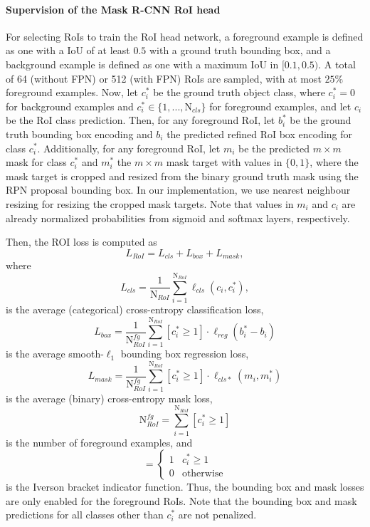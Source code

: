\paragraph{Supervision of the Mask R-CNN RoI head}
For selecting RoIs to train the RoI head network, a foreground example
is defined as one with a IoU of at least $0.5$ with
a ground truth bounding box, and a background example is defined as
one with a maximum IoU in $[0.1, 0.5)$.
A total of 64 (without FPN) or 512 (with FPN) RoIs are sampled, with
at most $25\%$ foreground examples.
Now, let $c_i^*$ be the ground truth object class, where $c_i^* = 0$
for background examples and $c_i^* \in \{1, ..., \text{N}_{cls}\}$ for foreground examples,
and let $c_i$ be the RoI class prediction.
Then, for any foreground RoI, let $b_i^*$ be the ground truth bounding box encoding and $b_i$
the predicted refined RoI box encoding for class $c_i^*$.
Additionally, for any foreground RoI, let $m_i$ be the predicted $m \times m$ mask for class $c_i^*$
and $m_i^*$ the $m \times m$ mask target with values in $\{0,1\}$, where the mask target is cropped and resized from
the binary ground truth mask using the RPN proposal bounding box.
In our implementation, we use nearest neighbour resizing for resizing the cropped mask
targets.
Note that values in $m_i$ and $c_i$ are already normalized probabilities from
sigmoid and softmax layers, respectively.

Then, the ROI loss is computed as
\begin{equation}
L_{RoI} = L_{cls} + L_{box} + L_{mask},
\end{equation}
where
\begin{equation}
L_{cls} = \frac{1}{\text{N}_{RoI}} \sum_{i=1}^{\text{N}_{RoI}} \ell_{cls}(c_i, c_i^*),
\end{equation}
is the average (categorical) cross-entropy classification loss,
\begin{equation}
L_{box} = \frac{1}{\text{N}_{RoI}^{\mathit{fg}}} \sum_{i=1}^{\text{N}_{RoI}} [c_i^* \geq 1] \cdot \ell_{reg}(b_i^* - b_i)
\end{equation}
is the average smooth-$\ell_1$ bounding box regression loss,
\begin{equation}
L_{mask} = \frac{1}{\text{N}_{RoI}^{\mathit{fg}}} \sum_{i=1}^{\text{N}_{RoI}} [c_i^* \geq 1] \cdot \ell_{cls*}(m_i,m_i^*)
\end{equation}
is the average (binary) cross-entropy mask loss,
\begin{equation}
\text{N}_{RoI}^{\mathit{fg}} = \sum_{i=1}^{\text{N}_{RoI}} [c_i^* \geq 1]
\end{equation}
is the number of foreground examples, and
\begin{equation}
[c_i^* \geq 1] =
\begin{cases}
1 &\text{$c_i^* \geq 1$} \\
0 &\text{otherwise}
\end{cases}
\end{equation}
is the Iverson bracket indicator function. Thus, the bounding box and mask
losses are only enabled for the foreground RoIs. Note that the bounding box and mask predictions
for all classes other than $c_i^*$ are not penalized.

